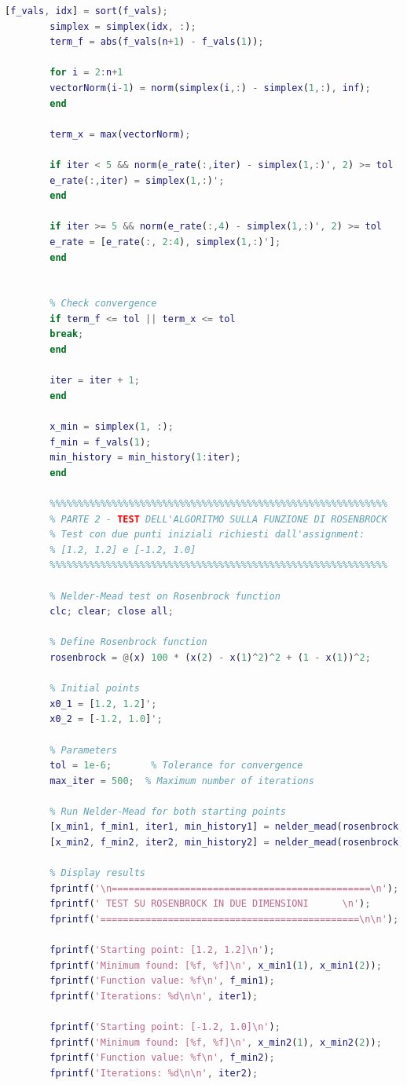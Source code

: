\documentclass[a4paper,12pt]{article}
\begin{document}
\begin{lstlisting}[language=Matlab,caption={Full script: Nelder Mead Method on all function},label={lst:rosenbrock-extended}]
		[f_vals, idx] = sort(f_vals); 
		simplex = simplex(idx, :); 
		term_f = abs(f_vals(n+1) - f_vals(1)); 
		
		for i = 2:n+1
		vectorNorm(i-1) = norm(simplex(i,:) - simplex(1,:), inf);
		end
		
		term_x = max(vectorNorm);
		
		if iter < 5 && norm(e_rate(:,iter) - simplex(1,:)', 2) >= tol
		e_rate(:,iter) = simplex(1,:)';
		end
		
		if iter >= 5 && norm(e_rate(:,4) - simplex(1,:)', 2) >= tol
		e_rate = [e_rate(:, 2:4), simplex(1,:)'];
		end
		
		
		% Check convergence
		if term_f <= tol || term_x <= tol 
		break;
		end
		
		iter = iter + 1;
		end
		
		x_min = simplex(1, :);
		f_min = f_vals(1);
		min_history = min_history(1:iter);
		end
		
		%%%%%%%%%%%%%%%%%%%%%%%%%%%%%%%%%%%%%%%%%%%%%%%%%%%%%%%%%%%%
		% PARTE 2 - TEST DELL'ALGORITMO SULLA FUNZIONE DI ROSENBROCK
		% Test con due punti iniziali richiesti dall'assignment:
		% [1.2, 1.2] e [-1.2, 1.0]
		%%%%%%%%%%%%%%%%%%%%%%%%%%%%%%%%%%%%%%%%%%%%%%%%%%%%%%%%%%%%
		
		% Nelder-Mead test on Rosenbrock function
		clc; clear; close all;
		
		% Define Rosenbrock function
		rosenbrock = @(x) 100 * (x(2) - x(1)^2)^2 + (1 - x(1))^2;
		
		% Initial points
		x0_1 = [1.2, 1.2]';
		x0_2 = [-1.2, 1.0]';
		
		% Parameters
		tol = 1e-6;       % Tolerance for convergence
		max_iter = 500;  % Maximum number of iterations
		
		% Run Nelder-Mead for both starting points
		[x_min1, f_min1, iter1, min_history1] = nelder_mead(rosenbrock, x0_1, tol, max_iter);
		[x_min2, f_min2, iter2, min_history2] = nelder_mead(rosenbrock, x0_2, tol, max_iter);
		
		% Display results
		fprintf('\n==============================================\n');
		fprintf(' TEST SU ROSENBROCK IN DUE DIMENSIONI      \n');
		fprintf('==============================================\n\n');
		
		fprintf('Starting point: [1.2, 1.2]\n');
		fprintf('Minimum found: [%f, %f]\n', x_min1(1), x_min1(2));
		fprintf('Function value: %f\n', f_min1);
		fprintf('Iterations: %d\n\n', iter1);
		
		fprintf('Starting point: [-1.2, 1.0]\n');
		fprintf('Minimum found: [%f, %f]\n', x_min2(1), x_min2(2));
		fprintf('Function value: %f\n', f_min2);
		fprintf('Iterations: %d\n\n', iter2);
		

\end{lstlisting}
\end{document}
